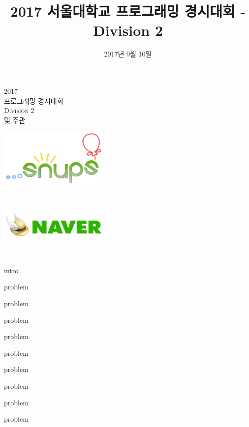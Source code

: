 \documentclass[11pt,a4paper,oneside,final]{article}
\title{2017 서울대학교 프로그래밍 경시대회 - Division 2}
\date{2017년 9월 10일}
\begin{document}
\begin{titlepage}
\begin{center}

\vspace*{3cm}

\textsc{\Huge2017}\\[0.5cm]
\textsc{ 프로그래밍 경시대회}\\[1cm]
\textsc{\Huge Division 2}\\[2cm]

\vspace{2cm}
\textsc{ 및 주관}\\[0.0cm]

\begin{center}
\includegraphics[width=0.4\textwidth]{snups.png}
\end{center}

\vspace{1cm}
\textsc{}\\[0.0cm]

\begin{center}
\includegraphics[width=0.4\textwidth]{naver.jpg}
\end{center}

\vspace{1cm}
\textsc{\Large \THEDATE}\\[0.5cm]

\vspace*{\fill}

\end{center}
\end{titlepage}

{intro}

{problem}

{problem}

{problem}

{problem}

{problem}

{problem}

{problem}

{problem}

{problem}
\end{document}
